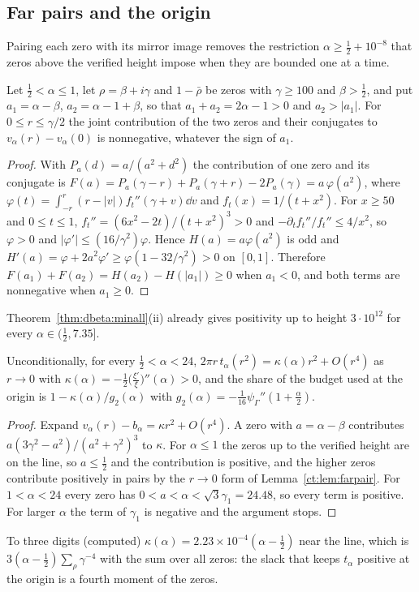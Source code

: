 \subsection{Far pairs and the origin}
Pairing each zero with its mirror image removes the restriction $\alpha\ge\frac12+10^{-8}$ that zeros above the verified height impose when they are bounded one at a time.
\begin{lemma}\label{ct:lem:farpair}
Let $\frac12<\alpha\le1$, let $\rho=\beta+i\gamma$ and $1-\bar\rho$ be zeros with $\gamma\ge100$ and $\beta>\frac12$, and put $a_1=\alpha-\beta$, $a_2=\alpha-1+\beta$, so that $a_1+a_2=2\alpha-1>0$ and $a_2>|a_1|$. For $0\le r\le\gamma/2$ the joint contribution of the two zeros and their conjugates to $v_\alpha(r)-v_\alpha(0)$ is nonnegative, whatever the sign of $a_1$.
\end{lemma}
\begin{proof}
With $P_a(d)=a/(a^2+d^2)$ the contribution of one zero and its conjugate is $F(a)=P_a(\gamma-r)+P_a(\gamma+r)-2P_a(\gamma)=a\,\varphi(a^2)$, where $\varphi(t)=\int_{-r}^r(r-|v|)f_t''(\gamma+v)\dd v$ and $f_t(x)=1/(t+x^2)$. For $x\ge50$ and $0\le t\le1$, $f_t''=(6x^2-2t)/(t+x^2)^3>0$ and $-\partial_tf_t''/f_t''\le4/x^2$, so $\varphi>0$ and $|\varphi'|\le(16/\gamma^2)\varphi$. Hence $H(a)=a\varphi(a^2)$ is odd and $H'(a)=\varphi+2a^2\varphi'\ge\varphi(1-32/\gamma^2)>0$ on $[0,1]$. Therefore $F(a_1)+F(a_2)=H(a_2)-H(|a_1|)\ge0$ when $a_1<0$, and both terms are nonnegative when $a_1\ge0$.
\end{proof}
Theorem~\ref{thm:dbeta:minall}(ii) already gives positivity up to height $3\cdot10^{12}$ for every $\alpha\in(\frac12,7.35]$.

\begin{proposition}\label{ct:prop:curv}
Unconditionally, for every $\frac12<\alpha<24$, $2\pi r\,t_\alpha(r^2)=\kappa(\alpha)r^2+O(r^4)$ as $r\to0$ with $\kappa(\alpha)=-\frac12\big(\frac{\xi'}{\xi}\big)''(\alpha)>0$, and the share of the budget used at the origin is $1-\kappa(\alpha)/g_2(\alpha)$ with $g_2(\alpha)=-\frac1{16}\psi_\Gamma''(1+\frac\alpha2)$.
\end{proposition}
\begin{proof}
Expand $v_\alpha(r)-b_\alpha=\kappa r^2+O(r^4)$. A zero with $a=\alpha-\beta$ contributes $a(3\gamma^2-a^2)/(a^2+\gamma^2)^3$ to $\kappa$. For $\alpha\le1$ the zeros up to the verified height are on the line, so $a\le\frac12$ and the contribution is positive, and the higher zeros contribute positively in pairs by the $r\to0$ form of Lemma~\ref{ct:lem:farpair}. For $1<\alpha<24$ every zero has $0<a<\alpha<\sqrt3\gamma_1=24.48$, so every term is positive. For larger $\alpha$ the term of $\gamma_1$ is negative and the argument stops.
\end{proof}
To three digits (computed) $\kappa(\alpha)=2.23\times10^{-4}(\alpha-\frac12)$ near the line, which is $3(\alpha-\frac12)\sum_\rho\gamma^{-4}$ with the sum over all zeros: the slack that keeps $t_\alpha$ positive at the origin is a fourth moment of the zeros.

